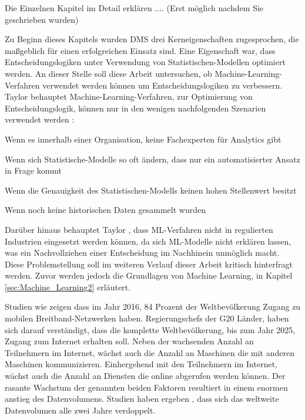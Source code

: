 Die Einzelnen Kapitel im Detail erklären .... (Erst möglich nachdem Sie geschrieben wurden)

Zu Beginn dieses Kapitels wurden DMS drei Kerneigenschaften zugesprochen, die maßgeblich für einen erfolgreichen Einsatz sind. Eine Eigenschaft war, dass Entscheidungslogiken unter Verwendung von Statistischen-Modellen optimiert werden. An dieser Stelle soll diese Arbeit untersuchen, ob Machine-Learning-Verfahren verwendet werden können um Entscheidungslogiken zu verbessern. Taylor behauptet Machine-Learning-Verfahren, zur Optimierung von Entscheidungslogik, können nur in den wenigen nachfolgenden Szenarien verwendet werden \cite[vgl. S. 179]{JT11}: 

\begin{enumerate*}
\item Wenn es innerhalb einer Organisation, keine Fachexperten für Analytics gibt 
\item Wenn sich Statistische-Modelle so oft ändern, dass nur ein automatisierter Ansatz in Frage kommt
\item Wenn die Genauigkeit des Statistischen-Modells keinen hohen Stellenwert besitzt
\item Wenn noch keine historischen Daten gesammelt wurden      
\end{enumerate*} 

Darüber hinaus behauptet Taylor \cite[vgl. S. 179]{JT11}, dass ML-Verfahren nicht in regulierten Industrien eingesetzt werden können, da sich ML-Modelle nicht erklären lassen, was ein Nachvollziehen einer Entscheidung im Nachhinein unmöglich macht. Diese Problemstellung soll im weiteren Verlauf dieser Arbeit kritisch hinterfragt werden. Zuvor werden jedoch  die Grundlagen von Machine Learning, in Kapitel \ref{sec:Machine_Learning2} erläutert.

Studien wie zeigen dass im Jahr 2016, 84 Prozent der Weltbevölkerung Zugang zu mobilen Breitband-Netzwerken haben. Regierungschefs der G20 Länder, haben sich darauf verständigt, dass die komplette Weltbevölkerung, bis zum Jahr 2025, Zugang zum Internet erhalten soll. Neben der wachsenden Anzahl an Teilnehmern im Internet, wächst auch die Anzahl an Maschinen die mit anderen Maschinen kommunizieren. Einhergehend mit den Teilnehmern im Internet, wächst auch die Anzahl an Diensten die online abgerufen werden können. Der rasante Wachstum der genannten beiden Faktoren resultiert in einem enormen anstieg des Datenvolumens. Studien haben ergeben , dass sich das weltweite Datenvolumen alle zwei Jahre verdoppelt.       

